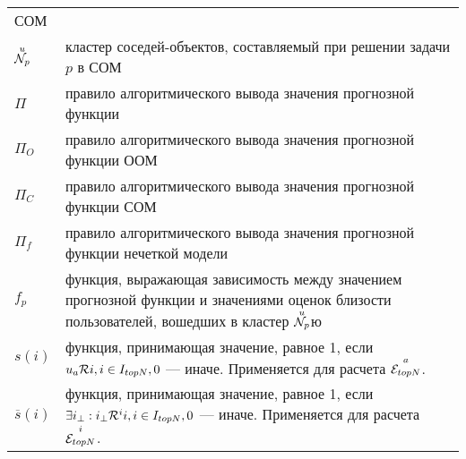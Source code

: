 \begin{longtable}{p{3cm}p{13cm}}
	СОМ\\
	${\overset{u}{\mathcal{N}_p}}$ & кластер соседей-объектов, составляемый при решении задачи $p$ в
	СОМ\\
	$\Pi$ & правило алгоритмического вывода значения прогнозной функции\\
	$\Pi_O$ & правило алгоритмического вывода значения прогнозной функции ООМ\\
	$\Pi_C$ & правило алгоритмического вывода значения прогнозной функции СОМ\\
	$\Pi_f$ & правило алгоритмического вывода значения прогнозной функции
	нечеткой модели\\
	$f_p$ & функция, выражающая зависимость между значением прогнозной функции
	и значениями оценок близости пользователей, вошедших в кластер ${\overset{u}{\mathcal{N}_p}}$ю\\
	$s(i)$ & функция, принимающая значение, равное 1, если $u_a \mathcal{R}
	i, i \in I_{topN}, 0$ --- иначе. Применяется для расчета ${\overset{a}{\mathcal{E}_{topN}}}$.\\
	$\overline{s}(i)$ & функция, принимающая значение, равное 1,
	если $\exists i_{\bot}: i_{\bot} \mathcal{R}^i i, i \in I_{topN}, 0$ --- иначе.
	Применяется для расчета ${\overset{i}{\mathcal{E}_{topN}}}$.\\
\end{longtable}
